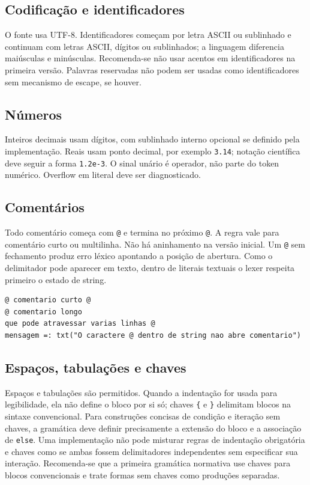 \documentclass[12pt,a4paper]{article}
\begin{document}
\subsection{Codificação e identificadores}
O fonte usa UTF-8. Identificadores começam por letra ASCII ou sublinhado e continuam com letras ASCII, dígitos ou sublinhados; a linguagem diferencia maiúsculas e minúsculas. Recomenda-se não usar acentos em identificadores na primeira versão. Palavras reservadas não podem ser usadas como identificadores sem mecanismo de escape, se houver.
\subsection{Números}
Inteiros decimais usam dígitos, com sublinhado interno opcional se definido pela implementação. Reais usam ponto decimal, por exemplo \texttt{3.14}; notação científica deve seguir a forma \texttt{1.2e-3}. O sinal unário é operador, não parte do token numérico. Overflow em literal deve ser diagnosticado.
\subsection{Comentários}
Todo comentário começa com \texttt{@} e termina no próximo \texttt{@}. A regra vale para comentário curto ou multilinha. Não há aninhamento na versão inicial. Um \texttt{@} sem fechamento produz erro léxico apontando a posição de abertura. Como o delimitador pode aparecer em texto, dentro de literais textuais o lexer respeita primeiro o estado de string.
\begin{lstlisting}
@ comentario curto @
@ comentario longo
que pode atravessar varias linhas @
mensagem =: txt("O caractere @ dentro de string nao abre comentario")
\end{lstlisting}
\subsection{Espaços, tabulações e chaves}
Espaços e tabulações são permitidos. Quando a indentação for usada para legibilidade, ela não define o bloco por si só; chaves \texttt{\{} e \texttt{\}} delimitam blocos na sintaxe convencional. Para construções concisas de condição e iteração sem chaves, a gramática deve definir precisamente a extensão do bloco e a associação de \texttt{else}. Uma implementação não pode misturar regras de indentação obrigatória e chaves como se ambas fossem delimitadores independentes sem especificar sua interação. Recomenda-se que a primeira gramática normativa use chaves para blocos convencionais e trate formas sem chaves como produções separadas.
\end{document}
